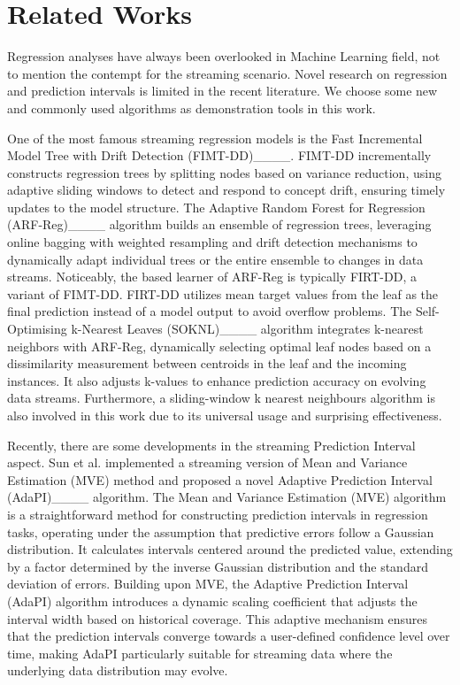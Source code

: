 \section{Related Works}
\label{sec:related}
Regression analyses have always been overlooked in Machine Learning field, not to mention the contempt for the streaming scenario.
Novel research on regression and prediction intervals is limited in the recent literature. 
We choose some new and commonly used algorithms as demonstration tools in this work.

One of the most famous streaming regression models is the Fast Incremental Model Tree with Drift Detection (FIMT-DD)____. FIMT-DD incrementally constructs regression trees by splitting nodes based on variance reduction, using adaptive sliding windows to detect and respond to concept drift, ensuring timely updates to the model structure.
The Adaptive Random Forest for Regression (ARF-Reg)____ algorithm builds an ensemble of regression trees, leveraging online bagging with weighted resampling and drift detection mechanisms to dynamically adapt individual trees or the entire ensemble to changes in data streams. Noticeably, the based learner of ARF-Reg is typically FIRT-DD, a variant of FIMT-DD. FIRT-DD utilizes mean target values from the leaf as the final prediction instead of a model output to avoid overflow problems.
The Self-Optimising k-Nearest Leaves (SOKNL)____ algorithm integrates k-nearest neighbors with ARF-Reg, dynamically selecting optimal leaf nodes based on a dissimilarity measurement between centroids in the leaf and the incoming instances. It also adjusts k-values to enhance prediction accuracy on evolving data streams.
Furthermore, a sliding-window k nearest neighbours algorithm is also involved in this work due to its universal usage and surprising effectiveness. 

Recently, there are some developments in the streaming Prediction Interval aspect. Sun et al. implemented a streaming version of Mean and Variance Estimation (MVE) method and proposed a novel Adaptive Prediction Interval (AdaPI)____ algorithm. The Mean and Variance Estimation (MVE) algorithm is a straightforward method for constructing prediction intervals in regression tasks, operating under the assumption that predictive errors follow a Gaussian distribution. It calculates intervals centered around the predicted value, extending by a factor determined by the inverse Gaussian distribution and the standard deviation of errors. Building upon MVE, the Adaptive Prediction Interval (AdaPI) algorithm introduces a dynamic scaling coefficient that adjusts the interval width based on historical coverage. This adaptive mechanism ensures that the prediction intervals converge towards a user-defined confidence level over time, making AdaPI particularly suitable for streaming data where the underlying data distribution may evolve.